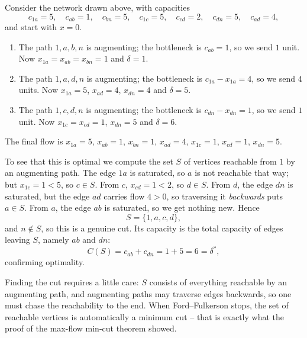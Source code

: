 \documentclass[a4paper]{scrartcl}
\begin{document}
\begin{example}
    Consider the network drawn above, with capacities
    $$
    c_{1a} = 5,\quad c_{ab} = 1,\quad c_{bn} = 5,\quad c_{1c} = 5,\quad c_{cd} = 2,\quad c_{dn} = 5,\quad c_{ad} = 4,
    $$
    and start with $x = 0$.
    \begin{enumerate}[label=(\roman*)]
        \item The path $1, a, b, n$ is augmenting; the bottleneck is $c_{ab} = 1$, so we send $1$ unit. Now $x_{1a} = x_{ab} = x_{bn} = 1$ and $\delta = 1$.
        \item The path $1, a, d, n$ is augmenting; the bottleneck is $c_{1a} - x_{1a} = 4$, so we send $4$ units. Now $x_{1a} = 5$, $x_{ad} = 4$, $x_{dn} = 4$ and $\delta = 5$.
        \item The path $1, c, d, n$ is augmenting; the bottleneck is $c_{dn} - x_{dn} = 1$, so we send $1$ unit. Now $x_{1c} = x_{cd} = 1$, $x_{dn} = 5$ and $\delta = 6$.
    \end{enumerate}
    The final flow is $x_{1a} = 5$, $x_{ab} = 1$, $x_{bn} = 1$, $x_{ad} = 4$, $x_{1c} = 1$, $x_{cd} = 1$, $x_{dn} = 5$.

    To see that this is optimal we compute the set $S$ of vertices reachable from $1$ by an augmenting path. The edge $1a$ is saturated, so $a$ is not reachable that way; but $x_{1c} = 1 < 5$, so $c \in S$. From $c$, $x_{cd} = 1 < 2$, so $d \in S$. From $d$, the edge $dn$ is saturated, but the edge $ad$ carries flow $4 > 0$, so traversing it \emph{backwards} puts $a \in S$. From $a$, the edge $ab$ is saturated, so we get nothing new. Hence
    $$
    S = \{1, a, c, d\},
    $$
    and $n \notin S$, so this is a genuine cut. Its capacity is the total capacity of edges leaving $S$, namely $ab$ and $dn$:
    $$
    C(S) = c_{ab} + c_{dn} = 1 + 5 = 6 = \delta^*,
    $$
    confirming optimality.
\end{example}

\begin{remark}
    Finding the cut requires a little care: $S$ consists of everything reachable by an augmenting path, and augmenting paths may traverse edges backwards, so one must chase the reachability to the end. When Ford--Fulkerson stops, the set of reachable vertices is automatically a minimum cut -- that is exactly what the proof of the max-flow min-cut theorem showed.
\end{remark}
\end{document}
